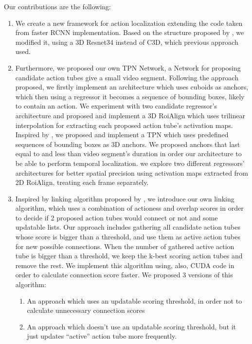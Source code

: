 Our contributions are the following:
\begin{enumerate}
\item We create a new framework for action localization extending the code taken from faster RCNN implementation. Based on the structure
  proposed by \cite{DBLP:journals/corr/HouCS17}, we modified it, using a 3D Resnet34 instead of C3D, which previous approach used.

\item Furthermore, we proposed our own TPN Network, a Network for proposing candidate action tubes give a small video segment.
  Following the approach \cite{DBLP:journals/corr/HouCS17} proposed, we firstly implement an architecture which uses
  cuboids as anchors, which then using a regressor it becomes a sequence of bounding boxes, likely to contain an action.
  We experiment with two candidate regressor's architecture and proposed and implement a 3D RoiAlign which uses trilinear
  interpolation for extracting each proposed action tube's activation maps. 
  Inspired by \cite{DBLP:journals/corr/abs-1712-09184}, we proposed and implement a TPN which uses predefined sequences of bounding
  boxes as 3D anchors. We proposed anchors that last equal to and less than video segment's duration in order our architecture to be able to
  perform temporal localization.  we explore two different regressors' architectures for better spatial precision using activation
  maps extracted from 2D RoiAlign, treating each frame separately.
\item Inspired by linking algorithm proposed by \cite{DBLP:journals/corr/HouCS17}, we introduce our own linking algorithm, which
  uses a combination of actioness and overlap scores in order to decide if 2 proposed action tubes would connect or not and some updatable lists.
  Our approach includes gathering all candidate action tubes whose score is bigger than a threshold, and use them as active action tubes for
  new possible connections. When the number of gathered active action tube is bigger than a threshold, we keep the k-best scoring action tubes
  and remove the rest.  We implement this algorithm using, also, CUDA code in order to calculate connection score faster. We proposed 3 versions of this algorithm:
  \begin{enumerate}
  \item An approach which uses an updatable scoring threshold, in order not to calculate unnecessary connection scores
  \item An approach which doesn't use an updatable scoring threshold, but it just updates ``active'' action tube more frequently.

\end{enumerate}
\end{enumerate}

